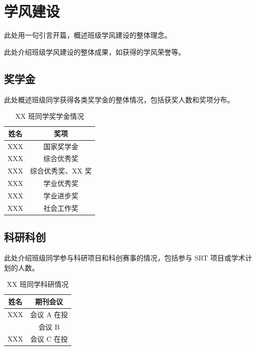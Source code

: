 \section{学风建设}

此处用一句引言开篇，概述班级学风建设的整体理念。

此处介绍班级学风建设的整体成果，如获得的学风荣誉等。

\subsection{奖学金}

此处概述班级同学获得各类奖学金的整体情况，包括获奖人数和奖项分布。

\begin{table}[H]
    \centering
    \begin{tabular}{||c|c||}
        \hline
        姓名   & 奖项             \\
        \hline
        XXX & 国家奖学金       \\
        XXX & 综合优秀奖       \\
        XXX & 综合优秀奖、XX 奖 \\
        XXX & 学业优秀奖       \\
        XXX & 学业进步奖       \\
        XXX & 社会工作奖       \\
        \hline
    \end{tabular}
    \caption{XX 班同学奖学金情况}
\end{table}

\subsection{科研科创}

此处介绍班级同学参与科研项目和科创赛事的情况，包括参与 SRT 项目或学术计划的人数。

\begin{table}[H]
    \centering
    \begin{tabular}{||c|c||}
        \hline
        \hline
        姓名   & 期刊会议     \\
        \hline
        XXX & 会议 A 在投 \\
            & 会议 B      \\
        \hline
        XXX & 会议 C 在投 \\
        \hline
        \hline
    \end{tabular}
    \caption{XX 班同学科研情况}
\end{table}

